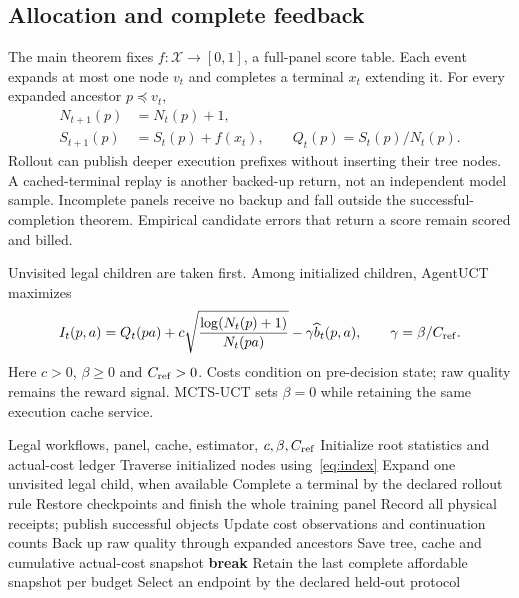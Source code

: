 \subsection{Allocation and complete feedback}
The main theorem fixes $f:\mathcal X\to[0,1]$, a full-panel score table.
Each event expands at most one node $v_t$ and completes a terminal $x_t$
extending it. For every expanded ancestor $p\preceq v_t$,
\begin{equation}
\begin{aligned}
N_{t+1}(p)&=N_t(p)+1,\\
S_{t+1}(p)&=S_t(p)+f(x_t),\qquad Q_t(p)=S_t(p)/N_t(p).
\end{aligned}
\label{eq:backup}
\end{equation}
Rollout can publish deeper execution prefixes without inserting their tree
nodes. A cached-terminal replay is another backed-up return, not an
independent model sample. Incomplete panels receive no backup and fall
outside the successful-completion theorem. Empirical candidate errors that
return a score remain scored and billed.

Unvisited legal children are taken first. Among initialized children,
AgentUCT maximizes
\begin{equation}
I_t(p,a)=Q_t(pa)+c\sqrt{\frac{\log(N_t(p)+1)}{N_t(pa)}}
-\gamma\widehat b_t(p,a),\qquad\gamma=\beta/C_{\rm ref}.
\label{eq:index}
\end{equation}
Here $c>0$, $\beta\ge0$ and $C_{\rm ref}>0$. Costs condition on pre-decision
state; raw quality remains the reward signal. MCTS-UCT sets $\beta=0$ while
retaining the same execution cache service.

\begin{algorithm}[t]
\caption{AgentUCT with complete feedback and actual-cost snapshots}
\label{alg:agentuct}
\begin{algorithmic}[1]
\Require Legal workflows, panel, cache, estimator, $c,\beta,C_{\rm ref}$
\State Initialize root statistics and actual-cost ledger
\State Traverse initialized nodes using~\eqref{eq:index}
\State Expand one unvisited legal child, when available
\State Complete a terminal by the declared rollout rule
\State Restore checkpoints and finish the whole training panel
\State Record all physical receipts; publish successful objects
\State Update cost observations and continuation counts
\State Back up raw quality through expanded ancestors
\State Save tree, cache and cumulative actual-cost snapshot
\EndIf
{}
\State \textbf{break}
\EndIf
\EndWhile
\State Retain the last complete affordable snapshot per budget
\State Select an endpoint by the declared held-out protocol
\end{algorithmic}
\end{algorithm}

